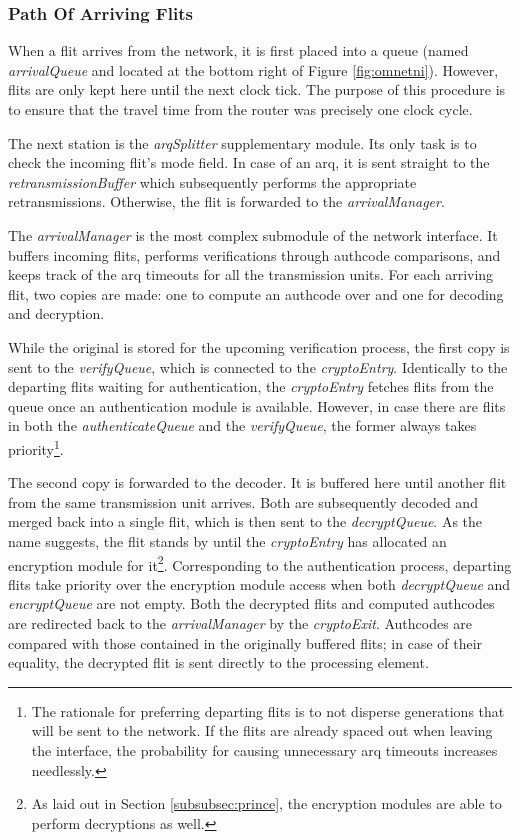 \subsubsection{Path Of Arriving Flits}
When a flit arrives from the network, it is first placed into a queue (named \textit{arrivalQueue} and located at the bottom right of Figure
\ref{fig:omnetni}). However, flits are only kept here until the next clock tick. The purpose of this procedure is to ensure that the travel time from
the router was precisely one clock cycle.

The next station is the \textit{arqSplitter} supplementary module. Its only task is to check the incoming flit's mode field. In case of an
\gls{arq}, it is sent straight to the \textit{retransmissionBuffer} which subsequently performs the appropriate retransmissions. Otherwise, the flit
is forwarded to the \textit{arrivalManager}.

The \textit{arrivalManager} is the most complex submodule of the network interface. It buffers incoming flits, performs verifications through authcode
comparisons, and keeps track of the \gls{arq} timeouts for all the transmission units. For each arriving flit, two copies are made: one to compute an
authcode over and one for decoding and decryption.

While the original is stored for the upcoming verification process, the first copy is sent to the
\textit{verifyQueue}, which is connected to the \textit{cryptoEntry}. Identically to the departing flits waiting for authentication, the
\textit{cryptoEntry} fetches flits from the queue once an authentication module is available. However, in case there are flits in both the
\textit{authenticateQueue} and the \textit{verifyQueue}, the former always takes priority\footnote{The rationale for preferring departing flits is to
not disperse generations that will be sent to the network. If the flits are already spaced out when leaving the interface, the probability for causing
unnecessary \gls{arq} timeouts increases needlessly.}.

The second copy is forwarded to the decoder. It is buffered here until another flit from the
same transmission unit arrives. Both are subsequently decoded and merged back into a single flit, which is then sent to the \textit{decryptQueue}. As
the name suggests, the flit stands by until the \textit{cryptoEntry} has allocated an encryption module for it\footnote{As laid out in Section
\ref{subsubsec:prince}, the encryption modules are able to perform decryptions as well.}. Corresponding to the authentication process, departing flits
take priority over the encryption module access when both \textit{decryptQueue} and \textit{encryptQueue} are not empty. Both the decrypted flits and
computed authcodes are redirected back to the \textit{arrivalManager} by the \textit{cryptoExit}. Authcodes are compared with those contained in the
originally buffered flits; in case of their equality, the decrypted flit is sent directly to the processing element.

